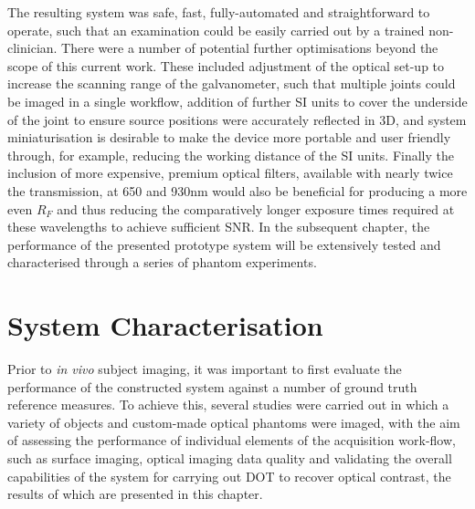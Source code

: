 \documentclass[twoside]{bhamthesis}
\theoremstyle{definition}
\begin{document}
The resulting system was safe, fast, fully-automated and straightforward to operate, such that an examination could be easily carried out by a trained non-clinician. There were a number of potential further optimisations beyond the scope of this current work. These included adjustment of the optical set-up to increase the scanning range of the galvanometer, such that multiple joints could be imaged in a single workflow, addition of further SI units to cover the underside of the joint to ensure source positions were accurately reflected in 3D, and system miniaturisation is desirable to make the device more portable and user friendly through, for example, reducing the working distance of the SI units. Finally the inclusion of more expensive, premium optical filters, available with nearly twice the transmission, at 650 and 930nm would also be beneficial for producing a more even $R_F$ and thus reducing the comparatively longer exposure times required at these wavelengths to achieve sufficient SNR. In the subsequent chapter, the performance of the presented prototype system will be extensively tested and characterised through a series of phantom experiments. 

\chapter{System Characterisation}
\label{chapter:System_Characterisation}

Prior to \textit{in vivo} subject imaging, it was important to first evaluate the performance of the constructed system against a number of ground truth reference measures. To achieve this, several studies were carried out in which a variety of objects and custom-made optical phantoms were imaged, with the aim of assessing the performance of individual elements of the acquisition work-flow, such as surface imaging, optical imaging data quality and validating the overall capabilities of the system for carrying out DOT to recover optical contrast, the results of which are presented in this chapter.

\end{document}
